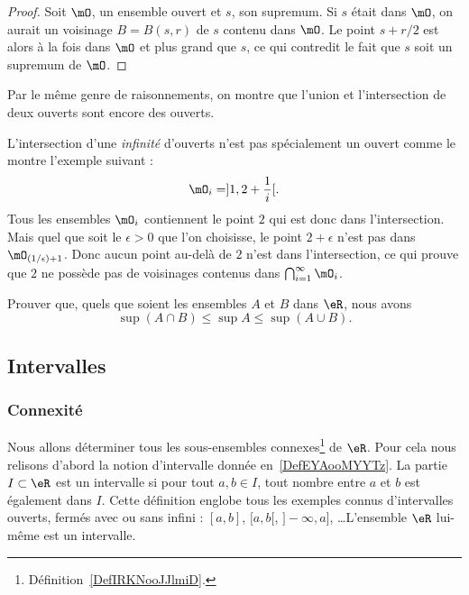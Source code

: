 \begin{proof}
Soit $\mO$, un ensemble ouvert et $s$, son supremum. Si $s$ était dans $\mO$, on aurait un voisinage $B=B(s,r)$ de $s$ contenu dans $\mO$. Le point $s+r/2$ est alors à la fois dans $\mO$ et plus grand que $s$, ce qui contredit le fait que $s$ soit un supremum de $\mO$.
\end{proof}

Par le même genre de raisonnements, on montre que l'union et l'intersection de deux ouverts sont encore des ouverts.

\begin{remark}
L'intersection d'une \emph{infinité} d'ouverts n'est pas spécialement un ouvert comme le montre l'exemple suivant :
\[
  \mO_i=]1,2+\frac{ 1 }{ i }[.
\]
Tous les ensembles $\mO_i$ contiennent le point $2$ qui est donc dans l'intersection. Mais quel que soit le $\epsilon>0$ que l'on choisisse, le point $2+\epsilon$ n'est pas dans $\mO_{(1/\epsilon)+1}$. Donc aucun point au-delà de $2$ n'est dans l'intersection, ce qui prouve que $2$ ne possède pas de voisinages contenus dans $\bigcap_{i=1}^{\infty}\mO_i$.
\end{remark}

\begin{proposition}
Prouver que, quels que soient les ensembles $A$ et $B$ dans $\eR$, nous avons
\[
  \sup(A\cap B)\leq\sup A\leq\sup(A\cup B).
\]
\end{proposition}

\subsection{Intervalles}

\subsubsection{Connexité}

Nous allons déterminer tous les sous-ensembles connexes\footnote{Définition~\ref{DefIRKNooJJlmiD}.} de $\eR$. Pour cela nous relisons d'abord la notion d'intervalle donnée en~\ref{DefEYAooMYYTz}. La partie \( I\subset \eR\) est un intervalle si pour tout \( a,b\in I\), tout nombre entre \( a\) et \( b\) est également dans \( I\). Cette définition englobe tous les exemples connus d'intervalles ouverts, fermés avec ou sans infini : $[a,b]$, $[a,b[$, $]-\infty,a]$, \ldots L'ensemble \( \eR\) lui-même est un intervalle.

